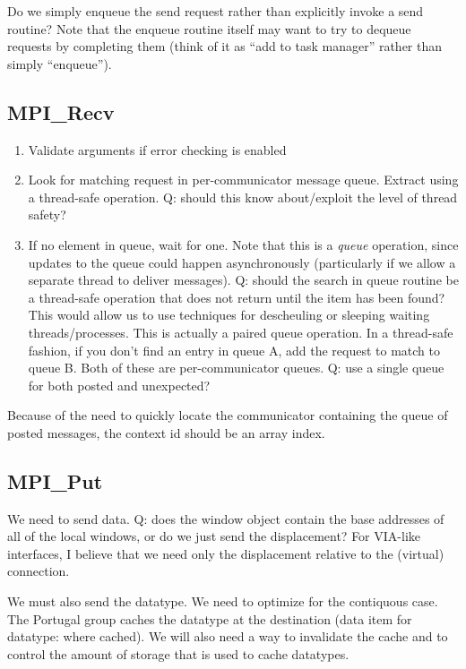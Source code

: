 \documentclass{article}
\begin{document}
Do we simply enqueue the send request rather than explicitly invoke a send
routine?  Note that the enqueue routine itself may want to try to dequeue
requests by completing them (think of it as ``add to task manager'' rather
than simply ``enqueue'').

\subsection{MPI\_Recv}
\begin{enumerate}
\item Validate arguments if error checking is enabled
\item Look for matching request in per-communicator message queue.  Extract
  using a thread-safe operation.  Q: should this know about/exploit the level
  of thread safety?
\item If no element in queue, wait for one.  Note that this is a \emph{queue}
  operation, since updates to the queue could happen asynchronously
  (particularly if we allow a separate thread to deliver messages).  Q: should
  the search in queue routine be a thread-safe operation that does not return
  until the item has been found?  This would allow us to use techniques for
  descheuling or sleeping waiting threads/processes.
  This is actually a paired queue operation.  In a thread-safe fashion, if you
  don't find an entry in queue A, add the request to match to queue B.  Both
  of these are per-communicator queues.  Q: use a single queue for both posted
  and unexpected?
\end{enumerate}

Because of the need to quickly locate the communicator containing the queue of
posted messages, the context id should be an array index.

\subsection{MPI\_Put}
We need to send data.  Q: does the window object contain the base addresses of
all of the local windows, or do we just send the displacement?  For VIA-like
interfaces, I believe that we need only the displacement relative to the
(virtual) connection.

We must also send the datatype.  We need to optimize for the contiquous case.
The Portugal group caches the datatype at the destination (data item for
datatype: where cached).  We will also need a way to invalidate the cache and
to control the amount of storage that is used to cache datatypes.
\end{document}
